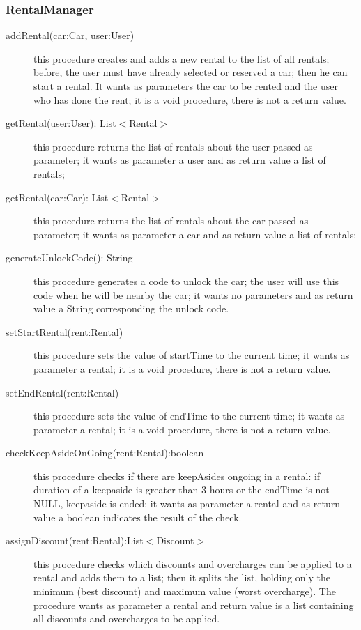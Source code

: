 \documentclass{scrreprt}
\begin{document}
\subsubsection{RentalManager}

\begin{description}
\item[addRental(car:Car, user:User)] this procedure creates and adds a new rental to the list of all rentals; before, the user must have already selected or reserved a car; then he can start a rental. It wants as parameters the car to be rented and the user who has done the rent; it is a void procedure, there is not a return value.
\item[getRental(user:User): List$<$Rental$>$] this procedure returns the list of rentals about the user passed as parameter; it wants as parameter a user and as return value a list of rentals;
\item[getRental(car:Car): List$<$Rental$>$] this procedure returns the list of rentals about the car passed as parameter; it wants as parameter a car and as return value a list of rentals;
\item[generateUnlockCode(): String] this procedure generates a code to unlock the car; the user will use this code when he will be nearby the car; it wants no parameters and as return value a String corresponding the unlock code.
\item[setStartRental(rent:Rental)] this procedure sets the value of startTime to the current time; it wants as parameter a rental; it is a void procedure, there is not a return value.
\item[setEndRental(rent:Rental)] this procedure sets the value of endTime to the current time; it wants as parameter a rental; it is a void procedure, there is not a return value.
\item[checkKeepAsideOnGoing(rent:Rental):boolean] this procedure checks if there are keepAsides ongoing in a rental: if duration of a keepaside is greater than 3 hours or the endTime is not NULL, keepaside is ended; it wants as parameter a rental and as return value a boolean indicates the result of the check.
\item[assignDiscount(rent:Rental):List$<$Discount$>$] this procedure checks which discounts and overcharges can be applied to a rental and adds them to a list; then it splits the list, holding only the minimum (best discount) and maximum value (worst overcharge). The procedure wants as parameter a rental and return value is a list containing all discounts and overcharges to be applied.
\end{description}
\end{document}
